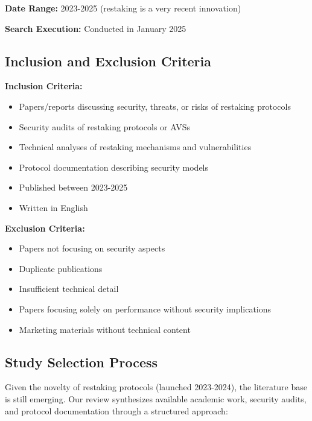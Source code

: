 \documentclass[runningheads]{llncs}
\begin{document}
\textbf{Date Range:} 2023-2025 (restaking is a very recent innovation)

\textbf{Search Execution:} Conducted in January 2025

\subsection{Inclusion and Exclusion Criteria}

\textbf{Inclusion Criteria:}
\begin{itemize}
    \item Papers/reports discussing security, threats, or risks of restaking protocols
    \item Security audits of restaking protocols or AVSs
    \item Technical analyses of restaking mechanisms and vulnerabilities
    \item Protocol documentation describing security models
    \item Published between 2023-2025
    \item Written in English
\end{itemize}

\textbf{Exclusion Criteria:}
\begin{itemize}
    \item Papers not focusing on security aspects
    \item Duplicate publications
    \item Insufficient technical detail
    \item Papers focusing solely on performance without security implications
    \item Marketing materials without technical content
\end{itemize}

\subsection{Study Selection Process}

Given the novelty of restaking protocols (launched 2023-2024), the literature base is still emerging. Our review synthesizes available academic work, security audits, and protocol documentation through a structured approach:
\end{document}
